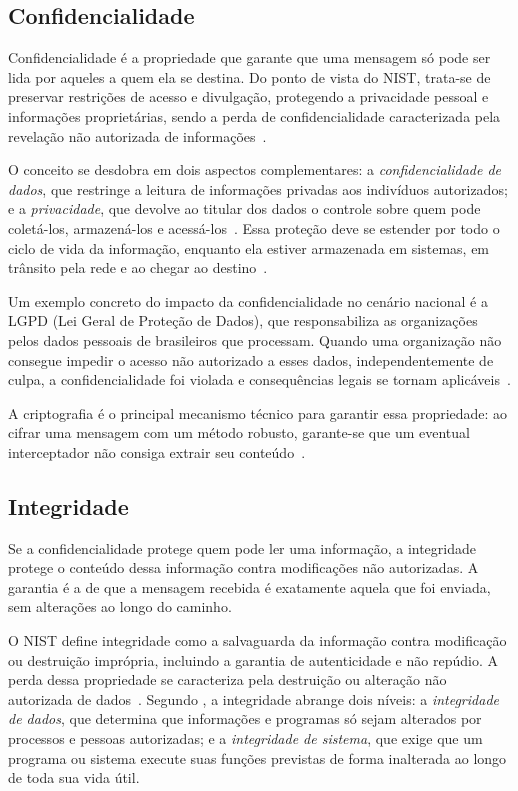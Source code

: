 \documentclass[12pt,a4paper]{report}
\begin{document}
\subsection{Confidencialidade}

Confidencialidade é a propriedade que garante que uma mensagem só pode
ser lida por aqueles a quem ela se destina. Do ponto de vista do NIST,
trata-se de preservar restrições de acesso e divulgação, protegendo a
privacidade pessoal e informações proprietárias, sendo a perda de
confidencialidade caracterizada pela revelação não autorizada de
informações~\cite{nist2004}.

O conceito se desdobra em dois aspectos complementares: a
\textit{confidencialidade de dados}, que restringe a leitura de
informações privadas aos indivíduos autorizados; e a
\textit{privacidade}, que devolve ao titular dos dados o controle sobre
quem pode coletá-los, armazená-los e acessá-los~\cite{stallings2014}.
Essa proteção deve se estender por todo o ciclo de vida da informação,
enquanto ela estiver armazenada em sistemas, em trânsito pela rede e ao
chegar ao destino~\cite{hintzbergen2018}.

Um exemplo concreto do impacto da confidencialidade no cenário nacional é
a LGPD (Lei Geral de Proteção de Dados), que responsabiliza as
organizações pelos dados pessoais de brasileiros que processam. Quando
uma organização não consegue impedir o acesso não autorizado a esses
dados, independentemente de culpa, a confidencialidade foi violada e
consequências legais se tornam aplicáveis~\cite{serpro2024}.

A criptografia é o principal mecanismo técnico para garantir essa
propriedade: ao cifrar uma mensagem com um método robusto, garante-se que
um eventual interceptador não consiga extrair seu
conteúdo~\cite{kurose2021}.

\subsection{Integridade}

Se a confidencialidade protege quem pode ler uma informação, a
integridade protege o conteúdo dessa informação contra modificações não
autorizadas. A garantia é a de que a mensagem recebida é exatamente
aquela que foi enviada, sem alterações ao longo do caminho.

O NIST define integridade como a salvaguarda da informação contra
modificação ou destruição imprópria, incluindo a garantia de
autenticidade e não repúdio. A perda dessa propriedade se caracteriza
pela destruição ou alteração não autorizada de dados~\cite{nist2004}.
Segundo , a integridade abrange dois níveis: a
\textit{integridade de dados}, que determina que informações e programas
só sejam alterados por processos e pessoas autorizadas; e a
\textit{integridade de sistema}, que exige que um programa ou sistema
execute suas funções previstas de forma inalterada ao longo de toda sua
vida útil.
\end{document}
